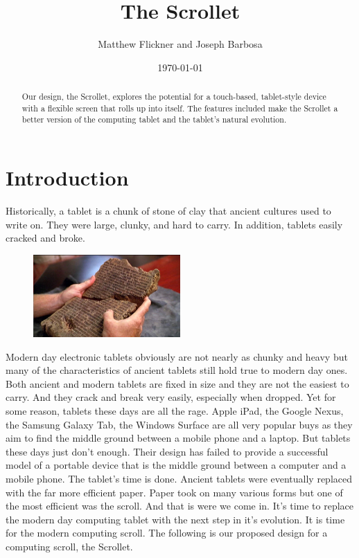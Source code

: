 \documentclass[a4paper]{article}
\title{The Scrollet}
\author{Matthew Flickner and Joseph Barbosa}
\date{\today}
\begin{document}
\maketitle

\begin{abstract}
Our design, the Scrollet, explores the potential for a touch-based, tablet-style device with a flexible screen that rolls up into itself. The features included make the Scrollet a better version of the computing tablet and the tablet's natural evolution.
\end{abstract}


\section{Introduction}
Historically, a tablet is a chunk of stone of clay that ancient cultures used to write on. They were large, clunky, and hard to carry. In addition, tablets easily cracked and broke.
\begin{figure}[H]
\centering
\includegraphics[width=0.5\textwidth]{ancienttablet.jpg}
\end{figure}
Modern day electronic tablets obviously are not nearly as chunky and heavy but many of the characteristics of ancient tablets still hold true to modern day ones. Both ancient and modern tablets are fixed in size and they are not the easiest to carry. And they crack and break very easily, especially when dropped. Yet for some reason, tablets these days are all the rage. Apple iPad, the Google Nexus, the Samsung Galaxy Tab, the Windows Surface are all very popular buys as they aim to find the middle ground between a mobile phone and a laptop. But tablets these days just don't enough. Their design has failed to provide a successful model of a portable device that is the middle ground between a computer and a mobile phone. The tablet's time is done. Ancient tablets were eventually replaced with the far more efficient paper. Paper took on many various forms but one of the most efficient was the scroll. And that is were we come in. It's time to replace the modern day computing tablet with the next step in it's evolution. It is time for the modern computing scroll. The following is our proposed design for a computing scroll, the Scrollet.
\end{document}

